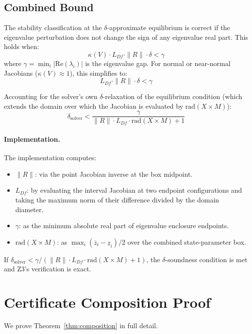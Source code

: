 \documentclass[11pt]{article}
\newcommand{\norm}[1]{\|#1\|}
\begin{document}
\subsection{Combined Bound}

The stability classification at the $\delta$-approximate equilibrium is correct if the eigenvalue perturbation does not change the sign of any eigenvalue real part.
This holds when:
\[
\kappa(V) \cdot L_{Df} \cdot \norm{R} \cdot \delta < \gamma
\]
where $\gamma = \min_i |\mathrm{Re}(\lambda_i)|$ is the eigenvalue gap.
For normal or near-normal Jacobians ($\kappa(V) \approx 1$), this simplifies to:
\[
L_{Df} \cdot \norm{R} \cdot \delta < \gamma
\]

Accounting for the solver's own $\delta$-relaxation of the equilibrium condition (which extends the domain over which the Jacobian is evaluated by $\mathrm{rad}(X \times M)$):
\[
\delta_{\mathrm{solver}} < \frac{\gamma}{\norm{R} \cdot L_{Df} \cdot \mathrm{rad}(X \times M) + 1}
\]

\paragraph{Implementation.}
The implementation computes:
\begin{itemize}
\item $\norm{R}$: via the point Jacobian inverse at the box midpoint.
\item $L_{Df}$: by evaluating the interval Jacobian at two endpoint configurations and taking the maximum norm of their difference divided by the domain diameter.
\item $\gamma$: as the minimum absolute real part of eigenvalue enclosure endpoints.
\item $\mathrm{rad}(X \times M)$: as $\max_i (\overline{z}_i - \underline{z}_i)/2$ over the combined state-parameter box.
\end{itemize}
If $\delta_{\mathrm{solver}} < \gamma / (\norm{R} \cdot L_{Df} \cdot \mathrm{rad}(X \times M) + 1)$, the $\delta$-soundness condition is met and Z3's verification is exact.

\section{Certificate Composition Proof}
\label{app:composition}

We prove Theorem~\ref{thm:composition} in full detail.
\end{document}
